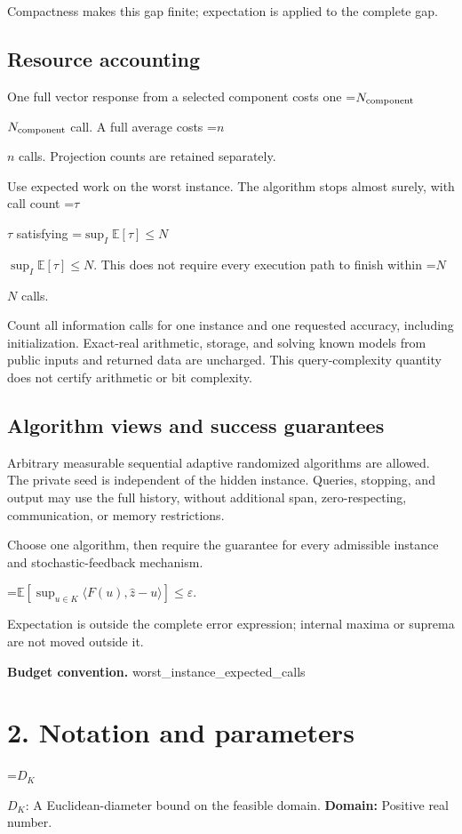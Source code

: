 \documentclass[10pt,a4paper]{article}
\newcommand{\AtlasMath}[1]{\par\begingroup\centering\setbox0=\hbox{$\displaystyle #1$}\ifdim\wd0>1.4\linewidth\typeout{ATLAS WIDE FORMULA: \the\wd0}\fi\ifdim\wd0>\linewidth\resizebox{\linewidth}{!}{\box0}\else\box0\fi\par\endgroup}
\newcommand{\AtlasInlineMath}[1]{\begingroup\setbox0=\hbox{$#1$}\ifdim\wd0>.4\linewidth\endgroup\AtlasMath{#1}\else\endgroup$#1$\fi}
\begin{document}
Compactness makes this gap finite; expectation is applied to the complete gap.

\subsection{Resource accounting}
One full vector response from a selected component costs one \AtlasInlineMath{N_{\rm component}} call. A full average costs \AtlasInlineMath{n} calls. Projection counts are retained separately.

Use expected work on the worst instance. The algorithm stops almost surely, with call count \AtlasInlineMath{\tau} satisfying \AtlasInlineMath{\sup_I\mathbb{E}[\tau]\le N}. This does not require every execution path to finish within \AtlasInlineMath{N} calls.

Count all information calls for one instance and one requested accuracy, including initialization. Exact-real arithmetic, storage, and solving known models from public inputs and returned data are uncharged. This query-complexity quantity does not certify arithmetic or bit complexity.

\subsection{Algorithm views and success guarantees}
Arbitrary measurable sequential adaptive randomized algorithms are allowed. The private seed is independent of the hidden instance. Queries, stopping, and output may use the full history, without additional span, zero-respecting, communication, or memory restrictions.

Choose one algorithm, then require the guarantee for every admissible instance and stochastic-feedback mechanism.


\AtlasMath{\mathbb{E}\!\left[\sup_{u\in K}\langle F(u),\widehat{z}-u\rangle\right]\le\varepsilon.}


Expectation is outside the complete error expression; internal maxima or suprema are not moved outside it.

\textbf{Budget convention.} worst\_instance\_expected\_calls

\section{2. Notation and parameters}
\AtlasInlineMath{D_K}: A Euclidean-diameter bound on the feasible domain. \textbf{Domain:} Positive real number.
\end{document}
